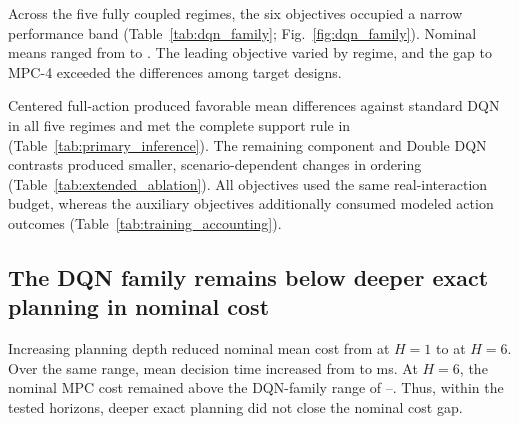 \documentclass[remotesensing,article,submit,moreauthors]{Definitions/mdpi}
\begin{document}
\begin{table}[H]
\centering
\caption{Training information and computation accounting. Wall time is mean $\pm$ SD across 20 models. ``Modeled action outcomes'' counts analytical action evaluations used by the learning objective. Information and computational budgets additionally reflect these modeled action outcomes.}
\label{tab:training_accounting}
\resizebox{0.92\textwidth}{!}{}
\end{table}

Across the five fully coupled regimes, the six objectives occupied a narrow performance band (Table~\ref{tab:dqn_family}; Fig.~\ref{fig:dqn_family}). Nominal means ranged from \DQNFamilyNominalMinCost{} to \DQNFamilyNominalMaxCost. The leading objective varied by regime, and the gap to MPC-4 exceeded the differences among target designs.

Centered full-action produced favorable mean differences against standard DQN in all five regimes and met the complete support rule in \PrimarySupportedCount{} (Table~\ref{tab:primary_inference}). The remaining component and Double DQN contrasts produced smaller, scenario-dependent changes in ordering (Table~\ref{tab:extended_ablation}). All objectives used the same real-interaction budget, whereas the auxiliary objectives additionally consumed modeled action outcomes (Table~\ref{tab:training_accounting}).

\subsection{The DQN family remains below deeper exact planning in nominal cost}

\begin{table}[H]
\centering
\caption{Nominal receding-horizon planning over 400 unique held-out traces. Each planner has perfect knowledge of the next $H$ tasks and exogenous link states and exactly enumerates $3^H$ sequences before every action. Runtime was measured on the same workstation and includes only planner action selection after environment construction. DQN inference time was not benchmarked in this experiment, so the table is not a matched deployment-latency comparison.}
\label{tab:planner_depth}
\resizebox{0.85\textwidth}{!}{}
\end{table}

Increasing planning depth reduced nominal mean cost from \PlannerCostHOne{} at $H=1$ to \PlannerCostHSix{} at $H=6$. Over the same range, mean decision time increased from \PlannerTimeHOne{} to \PlannerTimeHSix{} ms. At $H=6$, the nominal MPC cost remained above the DQN-family range of \DQNFamilyNominalMinCost--\DQNFamilyNominalMaxCost. Thus, within the tested horizons, deeper exact planning did not close the nominal cost gap.
\end{document}
